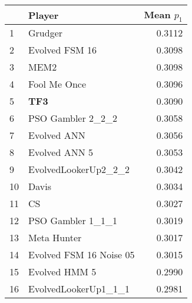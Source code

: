 \begin{tabular}{llr}
\toprule
{} &                   Player &  Mean $p_1$ \\
\midrule
1  &                  Grudger &      0.3112 \\
2  &           Evolved FSM 16 &      0.3098 \\
3  &                     MEM2 &      0.3098 \\
4  &             Fool Me Once &      0.3096 \\
5  &                      \textbf{TF3} &      0.3090 \\
6  &        PSO Gambler 2\_2\_2 &      0.3058 \\
7  &              Evolved ANN &      0.3056 \\
8  &            Evolved ANN 5 &      0.3053 \\
9  &     EvolvedLookerUp2\_2\_2 &      0.3042 \\
10 &                    Davis &      0.3034 \\
11 &                       CS &      0.3027 \\
12 &        PSO Gambler 1\_1\_1 &      0.3019 \\
13 &              Meta Hunter &      0.3017 \\
14 &  Evolved FSM 16 Noise 05 &      0.3015 \\
15 &            Evolved HMM 5 &      0.2990 \\
16 &     EvolvedLookerUp1\_1\_1 &      0.2981 \\
\bottomrule
\end{tabular}
